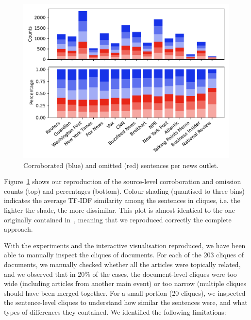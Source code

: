 \begin{figure}[!htbp]
    \centering
    \includegraphics[width=\linewidth]{figures/bountouridis_fig_3_noGA.pdf}
    \caption{Corroborated (blue) and omitted (red) sentences per news outlet.}
    \label{fig:figure_3_bountouridis_reproduced}
\end{figure}%

Figure~\ref{fig:figure_3_bountouridis_reproduced} shows our reproduction of the source-level corroboration and omission counts (top) and percentages (bottom).
Colour shading (quantised to three bins) indicates the average TF-IDF similarity among the sentences in cliques, i.e. the lighter the shade, the more dissimilar. This plot is almost identical to the one originally contained in~\citet{bountouridis2018explaining}, meaning that we reproduced correctly the complete approach.



With the experiments and the interactive visualisation reproduced, we have been able to manually inspect the cliques of documents. For each of the 203 cliques of documents, we manually checked whether all the articles were topically related, and we observed that in 20\% of the cases, the document-level cliques were too wide (including articles from another main event) or too narrow (multiple cliques should have been merged together.
For a small portion (20 cliques), we inspected the sentence-level cliques to understand how similar the sentences were, and what types of differences they contained.
We identified the following limitations:

